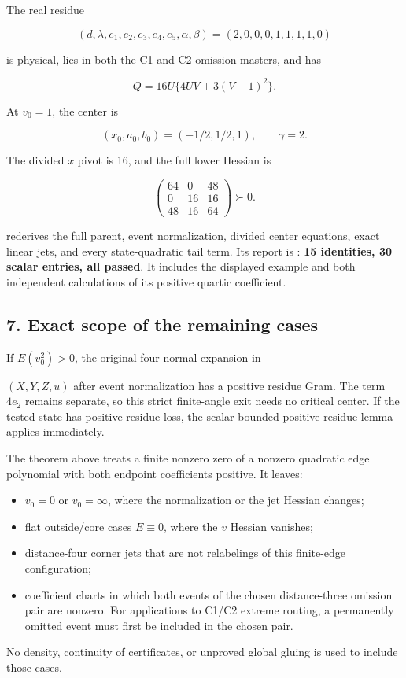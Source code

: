 The real residue

\[
(d,\lambda,e_1,e_2,e_3,e_4,e_5,\alpha,\beta)
=(2,0,0,0,1,1,1,1,0)
\]

is physical, lies in both the C1 and C2 omission masters, and has

\[
Q=16U\{4UV+3(V-1)^2\}.
\]

At \(v_0=1\), the center is

\[
(x_0,a_0,b_0)=(-1/2,1/2,1),\qquad \gamma=2.
\]

The divided \(x\) pivot is 16, and the full lower Hessian is

\[
\begin{pmatrix}64&0&48\\0&16&16\\48&16&64\end{pmatrix}\succ0.
\]

 rederives the full parent, event
normalization, divided center equations, exact linear jets, and every
state-quadratic tail term. Its report is
: \textbf{15 identities, 30 scalar entries,
all passed}. It includes the displayed example and both independent
calculations of its positive quartic coefficient.

\hypertarget{exact-scope-of-the-remaining-cases}{%
\subsection{7. Exact scope of the remaining cases}\label{p4ec1a51262f9:exact-scope-of-the-remaining-cases}}

If \(E(v_0^2)>0\), the original four-normal expansion in

\((X,Y,Z,u)\) after event normalization has a positive residue Gram.
The term \(4e_2\) remains separate, so this strict finite-angle exit needs
no critical center. If the tested state has positive residue loss, the
scalar bounded-positive-residue lemma applies immediately.

The theorem above treats a finite nonzero zero of a nonzero quadratic
edge polynomial with both endpoint coefficients positive. It leaves:

\begin{itemize}
\tightlist
\item
  \(v_0=0\) or \(v_0=\infty\), where the normalization or the jet Hessian
  changes;
\item
  flat outside/core cases \(E\equiv0\), where the \(v\) Hessian vanishes;
\item
  distance-four corner jets that are not relabelings of this finite-edge
  configuration;
\item
  coefficient charts in which both events of the chosen distance-three
  omission pair are nonzero. For applications to C1/C2 extreme routing,
  a permanently omitted event must first be included in the chosen pair.
\end{itemize}

No density, continuity of certificates, or unproved global gluing is used
to include those cases.
